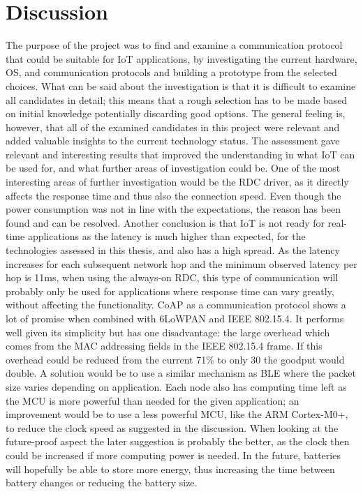 \section{Discussion} \label{sec:Conclusion}

The purpose of the project was to find and examine a communication protocol that could be suitable for IoT applications,
	by investigating the current hardware,
	OS,
	and communication protocols and building a prototype from the selected choices.
What can be said about the investigation is that it is difficult to examine all candidates in detail;
	this means that a rough selection has to be made based on initial knowledge potentially discarding good options.
The general feeling is,
	however,
	that all of the examined candidates in this project were relevant and added valuable insights to the current technology status.
The assessment gave relevant and interesting results that improved the understanding in what IoT can be used for,
	and what further areas of investigation could be.
One of the most interesting areas of further investigation would be the RDC driver,
	as it directly affects the response time and thus also the connection speed.
Even though the power consumption was not in line with the expectations,
	the reason has been found and can be resolved.
Another conclusion is that IoT is not ready for real-time applications as the latency is much higher than expected,
	for the technologies assessed in this thesis,
	and also has a high spread.
As the latency increases for each subsequent network hop and the minimum observed latency per hop is 11ms,
	when using the always-on RDC,
	this type of communication will probably only be used for applications where response time can vary greatly,
	without affecting the functionality.
CoAP as a communication protocol shows a lot of promise when combined with 6LoWPAN and IEEE 802.15.4.
It performs well given its simplicity but has one disadvantage:
	the large overhead which comes from the MAC addressing fields in the IEEE 802.15.4 frame.
If this overhead could be reduced from the current 71\% to only 30%
	the goodput would double.
A solution would be to use a similar mechanism as BLE where the packet size varies depending on application.
Each node also has computing time left as the MCU is more powerful  than needed for the given application;
	an improvement would be to use a less powerful MCU,
	like the ARM Cortex-M0+,
	to reduce the clock speed as suggested in the discussion.
When looking at the future-proof aspect the later suggestion is probably the better,
	as the clock then could be increased if more computing power is needed.
In the future,
	batteries will hopefully be able to store more energy,
	thus increasing the time between battery changes or reducing the battery size.

